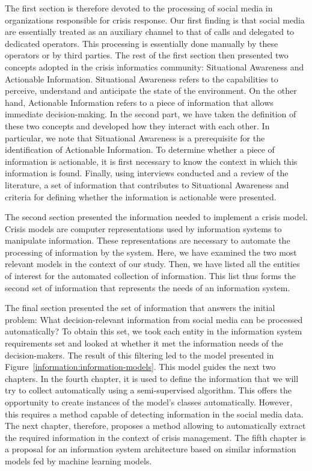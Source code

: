 The first section is therefore devoted to the processing of social media in organizations responsible for crisis response.
Our first finding is that social media are essentially treated as an auxiliary channel to that of calls and delegated to dedicated operators.
This processing is essentially done manually by these operators or by third parties.
The rest of the first section then presented two concepts adopted in the crisis informatics community: Situational Awareness and Actionable Information.
Situational Awareness refers to the capabilities to perceive, understand and anticipate the state of the environment.
On the other hand, Actionable Information refers to a piece of information that allows immediate decision-making.
In the second part, we have taken the definition of these two concepts and developed how they interact with each other.
In particular, we note that Situational Awareness is a prerequisite for the identification of Actionable Information.
To determine whether a piece of information is actionable, it is first necessary to know the context in which this information is found.
Finally, using interviews conducted and a review of the literature, a set of information that contributes to Situational Awareness and criteria for defining whether the information is actionable were presented.

The second section presented the information needed to implement a crisis model.
Crisis models are computer representations used by information systems to manipulate information.
These representations are necessary to automate the processing of information by the system.
Here, we have examined the two most relevant models in the context of our study.
Then, we have listed all the entities of interest for the automated collection of information.
This list thus forms the second set of information that represents the needs of an information system.

The final section presented the set of information that answers the initial problem: What decision-relevant information from social media can be processed automatically?
To obtain this set, we took each entity in the information system requirements set and looked at whether it met the information needs of the decision-makers.
The result of this filtering led to the model presented in Figure~\ref{information:information-models}.
This model guides the next two chapters.
In the fourth chapter, it is used to define the information that we will try to collect automatically using a semi-supervised algorithm.
This offers the opportunity to create instances of the model's classes automatically.
However, this requires a method capable of detecting information in the social media data.
The next chapter, therefore, proposes a method allowing to automatically extract the required information in the context of crisis management.
The fifth chapter is a proposal for an information system architecture based on similar information models fed by machine learning models.

